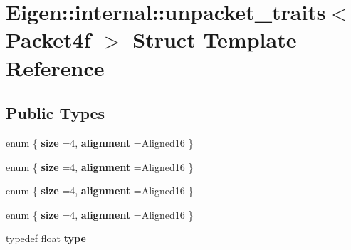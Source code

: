 \hypertarget{struct_eigen_1_1internal_1_1unpacket__traits_3_01_packet4f_01_4}{}\section{Eigen\+::internal\+::unpacket\+\_\+traits$<$ Packet4f $>$ Struct Template Reference}
\label{struct_eigen_1_1internal_1_1unpacket__traits_3_01_packet4f_01_4}
\subsection*{Public Types}
\begin{DoxyCompactItemize}
\item 
\mbox{\label{struct_eigen_1_1internal_1_1unpacket__traits_3_01_packet4f_01_4_a53104dca978017e6df404934656333be}} 
enum \{ {\bfseries size} =4, 
{\bfseries alignment} =Aligned16
 \}
\item 
\mbox{\label{struct_eigen_1_1internal_1_1unpacket__traits_3_01_packet4f_01_4_a119bcd8724e664cf13390efef19718cd}} 
enum \{ {\bfseries size} =4, 
{\bfseries alignment} =Aligned16
 \}
\item 
\mbox{\label{struct_eigen_1_1internal_1_1unpacket__traits_3_01_packet4f_01_4_a56bda74e3c6d510b97c07eeff23531e5}} 
enum \{ {\bfseries size} =4, 
{\bfseries alignment} =Aligned16
 \}
\item 
\mbox{\label{struct_eigen_1_1internal_1_1unpacket__traits_3_01_packet4f_01_4_acb51a629c6e8a0dc0124951422dea5ec}} 
enum \{ {\bfseries size} =4, 
{\bfseries alignment} =Aligned16
 \}
\item 
\mbox{\label{struct_eigen_1_1internal_1_1unpacket__traits_3_01_packet4f_01_4_aec581636b9b1f84c6f7900dd54f7933e}} 
typedef float {\bfseries type}
\item 
\mbox{\label{struct_eigen_1_1internal_1_1unpacket__traits_3_01_packet4f_01_4_a6fd79255574a93f1ca0eb2eb62ca1417}} 

\end{DoxyCompactItemize}
